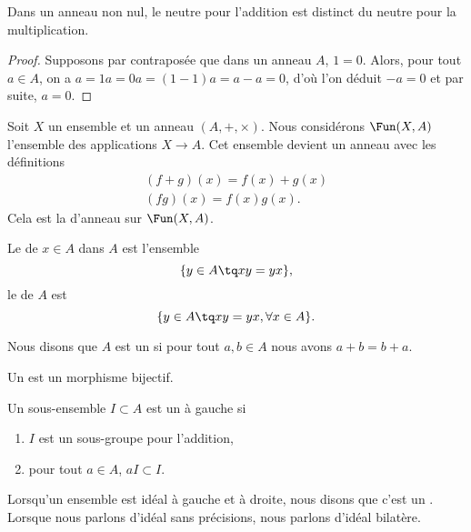 \begin{proposition}     \label{PROPooNCCGooXjVyVt}
    Dans un anneau non nul, le neutre pour l'addition est distinct du neutre pour la multiplication.
\end{proposition}
\begin{proof}
    Supposons par contraposée que dans un anneau $A$, \( 1 = 0 \). Alors, pour tout \( a \in A \), on a \( a = 1a = 0a = (1 - 1)a = a - a=0 \), d'où l'on déduit \( -a = 0  \) et par suite, \( a = 0. \)
\end{proof}

Soit \( X\) un ensemble et un anneau $(A, +, \times)$. Nous considérons \( \Fun(X,A)\) l'ensemble des applications \( X\to A\). Cet ensemble devient un anneau avec les définitions
\begin{subequations}
    \begin{align}
        (f+g)(x)=f(x)+g(x)\\
        (fg)(x)=f(x)g(x).
    \end{align}
\end{subequations}
Cela est la  d'anneau sur \( \Fun(X,A)\).

\begin{definition}
    Le  de \( x\in A\) dans \( A\) est l'ensemble
    \begin{equation}
        \{ y\in A\tq xy=yx \},
    \end{equation}
    le  de \( A\) est
    \begin{equation}
        \{ y\in A\tq xy=yx,\forall x\in A \}.
    \end{equation}
\end{definition}

\begin{definition}
    Nous disons que \( A\) est un  si pour tout \( a,b\in A\) nous avons \( a+b=b+a\).
\end{definition}

\begin{definition}
    Un  est un morphisme bijectif.
\end{definition}

\begin{definition}  \label{DefooQULAooREUIU}
    Un sous-ensemble \( I\subset A\) est un  à gauche si
    \begin{enumerate}
        \item
            \( I\) est un sous-groupe pour l'addition,
        \item
            pour tout \( a\in A\), \( aI\subset I\).
    \end{enumerate}

    Lorsqu'un ensemble est idéal à gauche et à droite, nous disons que c'est un . Lorsque nous parlons d'idéal sans précisions, nous parlons d'idéal bilatère.
\end{definition}


